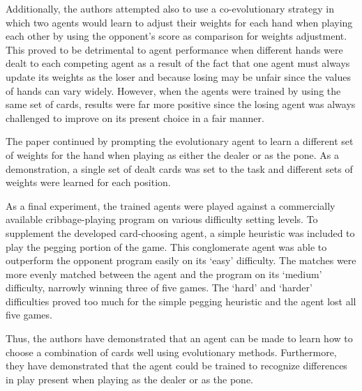 Additionally,
the authors attempted also to use a co-evolutionary strategy in which
two agents would learn to adjust their weights for each hand when playing each
other by using the opponent's score as comparison for weights adjustment.
%
This proved to be detrimental to agent performance when different hands were
dealt to each competing agent
as a result of the fact that one agent must always update its weights
as the loser
and because losing may be unfair since the values of hands can vary widely.
%
However,
when the agents were trained by using the same set of cards,
results were far more positive since the losing agent was always challenged to
improve on its present choice in a fair manner.

The paper continued by prompting the evolutionary agent to learn a different set
of weights for the hand
when playing as either the dealer or as the pone.
%
As a demonstration,
a single set of dealt cards was set to the task
and different sets of weights were learned for each position.

As a final experiment,
the trained agents were played against a commercially available cribbage-playing
program on various difficulty setting levels.
%
To supplement the developed card-choosing agent,
a simple heuristic was included to play the pegging portion of the game.
%
This conglomerate agent was able to outperform the opponent program
easily on its `easy' difficulty.
%
The matches were more evenly matched between the agent and the program on
its `medium' difficulty,
narrowly winning three of five games.
%
The `hard' and `harder' difficulties proved too much for the simple pegging
heuristic
and the agent lost all five games.

Thus,
the authors have demonstrated that an agent can be made to learn how to choose a
combination of cards well using evolutionary methods.
%
Furthermore,
they have demonstrated that the agent could be trained to recognize differences
in play present when playing as the dealer or as the pone.

